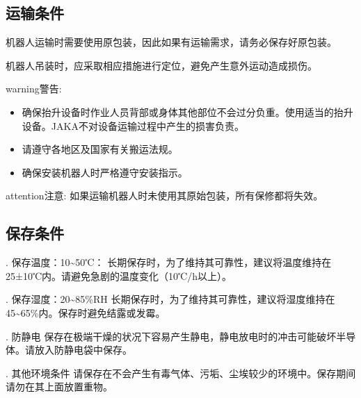 \documentclass[a4paper,11pt,english,openany,oneside]{sphinxmanual}
\begin{document}
\subsection{运输条件}
\label{\detokenize{08 _u5b89_u88c5_u4e0e_u8c03_u8bd5:id5}}\label{\detokenize{08 _u5b89_u88c5_u4e0e_u8c03_u8bd5:id6}}
\sphinxAtStartPar
机器人运输时需要使用原包装，因此如果有运输需求，请务必保存好原包装。

\sphinxAtStartPar
机器人吊装时，应采取相应措施进行定位，避免产生意外运动造成损伤。

\begin{sphinxadmonition}{warning}{警告:}\begin{itemize}
\item {} 
\sphinxAtStartPar
确保抬升设备时作业人员背部或身体其他部位不会过分负重。使用适当的抬升设备。JAKA不对设备运输过程中产生的损害负责。

\item {} 
\sphinxAtStartPar
请遵守各地区及国家有关搬运法规。

\item {} 
\sphinxAtStartPar
确保安装机器人时严格遵守安装指示。

\end{itemize}
\end{sphinxadmonition}

\begin{sphinxadmonition}{attention}{注意:}
\sphinxAtStartPar
如果运输机器人时未使用其原始包装，所有保修都将失效。
\end{sphinxadmonition}


\subsection{保存条件}
\label{\detokenize{08 _u5b89_u88c5_u4e0e_u8c03_u8bd5:id7}}\label{\detokenize{08 _u5b89_u88c5_u4e0e_u8c03_u8bd5:id8}}
.      保存温度：\sphinxhyphen{}10\textasciitilde{}50℃：
长期保存时，为了维持其可靠性，建议将温度维持在25±10℃内。请避免急剧的温度变化（10℃/h以上）。

.      保存湿度：20\textasciitilde{}85\%RH
长期保存时，为了维持其可靠性，建议将湿度维持在45\textasciitilde{}65\%内。保存时避免结露或发霉。

.      防静电
保存在极端干燥的状况下容易产生静电，静电放电时的冲击可能破坏半导体。请放入防静电袋中保存。

.      其他环境条件
请保存在不会产生有毒气体、污垢、尘埃较少的环境中。保存期间请勿在其上面放置重物。
\end{document}
